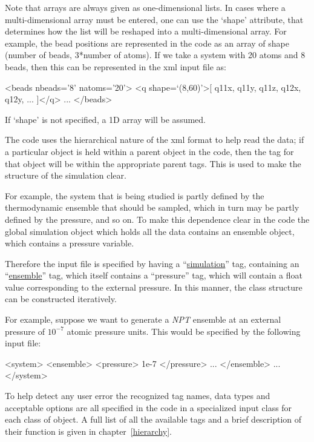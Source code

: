 \documentclass[11pt,english,fleqn]{report}
\newenvironment{code}{%
\footnotesize 
\verbatim
}{
\endverbatim
\normalsize
}
\begin{document}
Note that arrays are always given as one-dimensional lists. In cases
where a multi-dimensional array must be entered, one can use the `shape'
attribute, that determines how the list will be reshaped into a multi-dimensional
array. For example, the bead positions are
represented in the code as an array of shape 
(number of beads, 3*number of atoms). If we take a system with 20 atoms
and 8 beads, then this can be represented in the xml input file as:

\begin{code}
<beads nbeads='8' natoms='20'>
   <q shape=`(8,60)'>[ q11x, q11y, q11z, q12x, q12y, ... ]</q>
   ...
</beads>
\end{code}

If `shape' is not specified, a 1D array will be assumed.

The code uses the hierarchical nature of the xml format to help read the data; if
a particular object is held within a parent object in the code, then
the tag for that object will be within the appropriate parent tags.
This is used to make the structure of the simulation clear. 

For example,
the system that is being studied is partly defined by the thermodynamic
ensemble that should be sampled, which in turn may be partly defined
by the pressure, and so on. To make this dependence clear in the code
the global simulation object which holds all the data contains
an ensemble object, which contains a pressure variable.
 
Therefore the input file is specified
by having a {}``\hyperref[SIMULATION]{simulation}'' tag, containing an 
{}``\hyperref[ENSEMBLE]{ensemble}''
tag, which itself contains a {}``pressure'' tag, which will contain
a float value corresponding to the external pressure. In this
manner, the class structure can be constructed iteratively.

For example, suppose we want to generate a \emph{NPT} ensemble at an external
pressure of \(10^{-7}\) atomic pressure units. This would be specified by
the following input file:

\begin{code}
<system>
   <ensemble>
      <pressure> 1e-7 </pressure>
      ...
   </ensemble>
   ...
</system>
\end{code}

To help detect any user error the recognized tag names, data types
and acceptable options are all specified in the code in a specialized
input class for each class of object. A full list of all the available
tags and a brief description of their function is given in chapter~\ref{hierarchy}.
\end{document}
